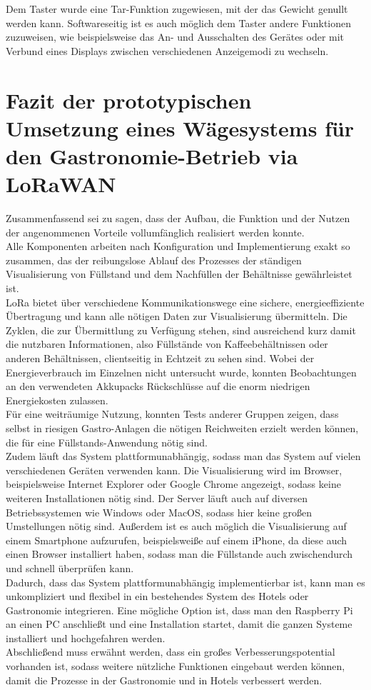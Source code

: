 \noindent
Dem Taster wurde eine Tar-Funktion zugewiesen, mit der das Gewicht genullt werden kann. Softwareseitig ist es auch möglich dem Taster andere Funktionen zuzuweisen, wie beispielsweise das An- und Ausschalten des Gerätes oder mit Verbund eines Displays zwischen verschiedenen Anzeigemodi zu wechseln.

\chapter{Fazit der prototypischen Umsetzung eines Wägesystems für den Gastronomie-Betrieb via LoRaWAN}
Zusammenfassend sei zu sagen, dass der Aufbau, die Funktion und der Nutzen der angenommenen Vorteile vollumfänglich realisiert werden konnte.\\
Alle Komponenten arbeiten nach Konfiguration und Implementierung exakt so zusammen, das der reibungslose Ablauf des Prozesses der ständigen Visualisierung von Füllstand und dem Nachfüllen der Behältnisse gewährleistet ist.\\
LoRa bietet über verschiedene Kommunikationswege eine sichere, energieeffiziente Übertragung und kann alle nötigen Daten zur Visualisierung übermitteln. Die Zyklen, die zur Übermittlung zu Verfügung stehen, sind ausreichend kurz damit die nutzbaren Informationen, also Füllstände von Kaffeebehältnissen oder anderen Behältnissen, clientseitig in Echtzeit zu sehen sind. Wobei der Energieverbrauch im Einzelnen nicht untersucht wurde, konnten Beobachtungen an den verwendeten Akkupacks Rückschlüsse auf die enorm niedrigen Energiekosten zulassen.\\
Für eine weiträumige Nutzung, konnten Tests anderer Gruppen zeigen, dass selbst in riesigen Gastro-Anlagen die nötigen Reichweiten erzielt werden können, die für eine Füllstands-Anwendung nötig sind.\\
Zudem läuft das System plattformunabhängig, sodass man das System auf vielen verschiedenen Geräten verwenden kann. Die Visualisierung wird im Browser, beispielsweise Internet Explorer oder Google Chrome angezeigt, sodass keine weiteren Installationen nötig sind. Der Server läuft auch auf diversen Betriebssystemen wie Windows oder MacOS, sodass hier keine großen Umstellungen nötig sind. Außerdem ist es auch möglich die Visualisierung auf einem Smartphone aufzurufen, beispielsweiße auf einem iPhone, da diese auch einen Browser installiert haben, sodass man die Füllstande auch zwischendurch und schnell überprüfen kann.\\
Dadurch, dass das System plattformunabhängig implementierbar ist, kann man es unkompliziert und flexibel in ein bestehendes System des Hotels oder Gastronomie integrieren. Eine mögliche Option ist, dass man den Raspberry Pi an einen PC anschließt und eine Installation startet, damit die ganzen Systeme installiert und hochgefahren werden. \\
Abschließend muss erwähnt werden, dass ein großes Verbesserungspotential vorhanden ist, sodass weitere nützliche Funktionen eingebaut werden können, damit die Prozesse in der Gastronomie und in Hotels verbessert werden.

